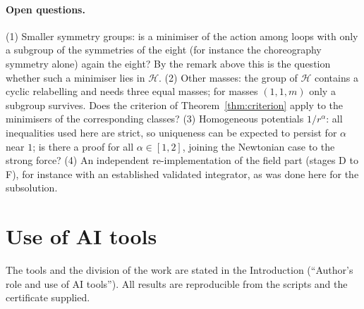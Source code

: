 \documentclass[11pt]{article}
\theoremstyle{definition}
\begin{document}
\paragraph{Open questions.} (1) Smaller symmetry groups: is a minimiser of the action among loops with only a
subgroup of the symmetries of the eight (for instance the choreography symmetry alone) again the eight? By the remark
above this is the question whether such a minimiser lies in $\mathcal H$. (2) Other masses: the group of $\mathcal H$ contains a cyclic relabelling and needs three equal masses; for masses
$(1,1,m)$ only a subgroup survives. Does the criterion of Theorem~\ref{thm:criterion} apply to the minimisers of the
corresponding classes? (3) Homogeneous potentials $1/r^\alpha$: all inequalities used here are strict, so uniqueness can
be expected to persist for $\alpha$ near $1$; is there a proof for all $\alpha\in[1,2]$, joining the Newtonian case to the strong
force? (4) An independent re-implementation of the field part (stages D to F), for instance with an established
validated integrator, as was done here for the subsolution.

\section*{Use of AI tools}
The tools and the division of the work are stated in the Introduction (``Author's role and use of AI tools''). All
results are reproducible from the scripts and the certificate supplied.

\appendix

\end{document}
